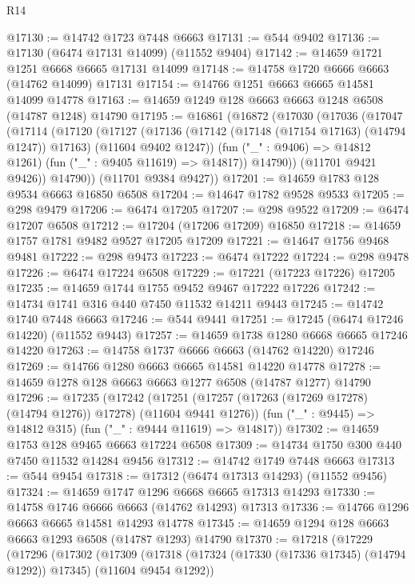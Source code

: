 \begin{lexlean}{R14}
\begin{coremodule}
@17130 := @14742 @1723 @7448 @6663
@17131 := @544 @9402
@17136 := @17130 (@6474 @17131 @14099) (@11552 @9404)
@17142 := @14659 @1721 @1251 @6668 @6665 @17131 @14099
@17148 := @14758 @1720 @6666 @6663 (@14762 @14099) @17131
@17154 := @14766 @1251 @6663 @6665 @14581 @14099 @14778
@17163 := @14659 @1249 @128 @6663 @6663 @1248 @6508 (@14787 @1248) @14790
@17195 := @16861
    (@16872
      (@17030
        (@17036
          (@17047
            (@17114
              (@17120
                (@17127
                  (@17136
                    (@17142 (@17148 (@17154 @17163) (@14794 @1247)) @17163)
                    (@11604 @9402 @1247))
                  (fun ("_" : @9406) => @14812 @1261)
                  (fun ("_" : @9405 @11619) => @14817))
                @14790))
            (@11701 @9421 @9426))
          @14790))
      (@11701 @9384 @9427))
@17201 := @14659 @1783 @128 @9534 @6663 @16850 @6508
@17204 := @14647 @1782 @9528 @9533
@17205 := @298 @9479
@17206 := @6474 @17205
@17207 := @298 @9522
@17209 := @6474 @17207 @6508
@17212 := @17204 (@17206 @17209) @16850
@17218 := @14659 @1757 @1781 @9482 @9527 @17205 @17209
@17221 := @14647 @1756 @9468 @9481
@17222 := @298 @9473
@17223 := @6474 @17222
@17224 := @298 @9478
@17226 := @6474 @17224 @6508
@17229 := @17221 (@17223 @17226) @17205
@17235 := @14659 @1744 @1755 @9452 @9467 @17222 @17226
@17242 := @14734 @1741 @316 @440 @7450 @11532 @14211 @9443
@17245 := @14742 @1740 @7448 @6663
@17246 := @544 @9441
@17251 := @17245 (@6474 @17246 @14220) (@11552 @9443)
@17257 := @14659 @1738 @1280 @6668 @6665 @17246 @14220
@17263 := @14758 @1737 @6666 @6663 (@14762 @14220) @17246
@17269 := @14766 @1280 @6663 @6665 @14581 @14220 @14778
@17278 := @14659 @1278 @128 @6663 @6663 @1277 @6508 (@14787 @1277) @14790
@17296 := @17235
    (@17242
      (@17251 (@17257 (@17263 (@17269 @17278) (@14794 @1276)) @17278) (@11604 @9441 @1276))
      (fun ("_" : @9445) => @14812 @315)
      (fun ("_" : @9444 @11619) => @14817))
@17302 := @14659 @1753 @128 @9465 @6663 @17224 @6508
@17309 := @14734 @1750 @300 @440 @7450 @11532 @14284 @9456
@17312 := @14742 @1749 @7448 @6663
@17313 := @544 @9454
@17318 := @17312 (@6474 @17313 @14293) (@11552 @9456)
@17324 := @14659 @1747 @1296 @6668 @6665 @17313 @14293
@17330 := @14758 @1746 @6666 @6663 (@14762 @14293) @17313
@17336 := @14766 @1296 @6663 @6665 @14581 @14293 @14778
@17345 := @14659 @1294 @128 @6663 @6663 @1293 @6508 (@14787 @1293) @14790
@17370 := @17218
    (@17229
      (@17296
        (@17302
          (@17309
            (@17318 (@17324 (@17330 (@17336 @17345) (@14794 @1292)) @17345) (@11604 @9454 @1292))

\end{coremodule}
\end{lexlean}
